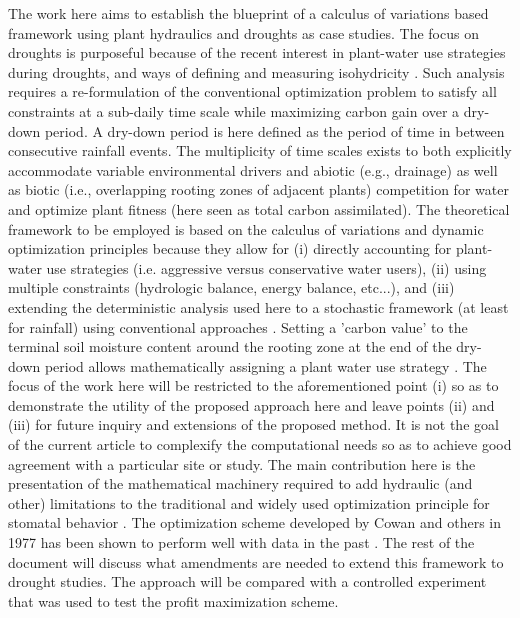 \documentclass[utf8]{frontiersSCNS} %
\begin{document}
The work here aims to establish the blueprint of a calculus of variations based framework using plant hydraulics and droughts as case studies.  The focus on droughts is purposeful because of the recent interest in plant-water use strategies during droughts, and ways of defining and measuring isohydricity \citep{franks_anisohydric_2007,martinezvilalta_new_2014,meinzer_mapping_2016}.  Such analysis requires a re-formulation of the conventional optimization problem to satisfy all constraints at a sub-daily time scale while maximizing carbon gain over a dry-down period. A dry-down period is here defined as the period of time in between consecutive rainfall events. The multiplicity of time scales exists to both explicitly accommodate variable environmental drivers and abiotic (e.g., drainage) as well as biotic (i.e., overlapping rooting zones of adjacent plants) competition for water and optimize plant fitness (here seen as total carbon assimilated). The theoretical framework to be employed is based on the calculus of variations and dynamic optimization principles because they allow for (i) directly accounting for plant-water use strategies (i.e. aggressive versus conservative water users), (ii) using multiple constraints (hydrologic balance, energy balance, etc...), and  (iii) extending the deterministic analysis used here to a stochastic framework (at least for rainfall) using conventional approaches  \citep{cowan1986economics,makela1996optimal,manzoni_optimization_2013,lu2016optimal}.  Setting a 'carbon value' to the terminal soil moisture content around the rooting zone at the end of the dry-down period allows mathematically assigning a plant water use strategy \citep{manzoni_optimization_2013}.   The focus of the work here will be restricted to the aforementioned point (i) so as to demonstrate the utility of the proposed approach here and leave points (ii) and (iii) for future inquiry and extensions of the proposed method. It is not the goal of the current article to complexify the computational needs so as to achieve good agreement with a particular site or study. The main contribution here is the presentation of the mathematical machinery required to add hydraulic (and other) limitations to the traditional and widely used optimization principle for stomatal behavior \citep{cowan_stomatal_1977,cowan1986economics}. The optimization scheme developed by Cowan and others in 1977 has been shown to perform well with data in the past \citep{dubois_2007,gu_2010}. The rest of the document will discuss what amendments are needed to extend this framework to drought studies.  The approach will be compared with a controlled experiment \citep{venturas_2018} that was used to test the profit maximization scheme.
\end{document}

